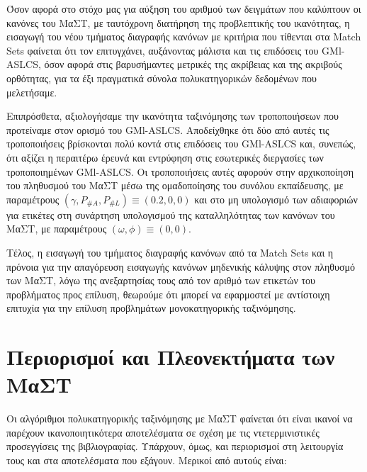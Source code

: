 Όσον αφορά στο στόχο μας για αύξηση του αριθμού των δειγμάτων που καλύπτουν οι κανόνες του ΜαΣΤ, με ταυτόχρονη διατήρηση της προβλεπτικής του ικανότητας, η εισαγωγή του νέου τμήματος διαγραφής κανόνων με κριτήρια που τίθενται στα Match Sets φαίνεται ότι τον επιτυγχάνει, αυξάνοντας μάλιστα και τις επιδόσεις του GMl-ASLCS, όσον αφορά στις βαρυσήμαντες μετρικές της ακρίβειας και της ακριβούς ορθότητας, για τα έξι πραγματικά σύνολα πολυκατηγορικών δεδομένων που μελετήσαμε.

Επιπρόσθετα, αξιολογήσαμε την ικανότητα ταξινόμησης των τροποποιήσεων που προτείναμε στον ορισμό του GMl-ASLCS. Αποδείχθηκε ότι δύο από αυτές τις τροποποιήσεις βρίσκονται πολύ κοντά στις επιδόσεις του GMl-ASLCS και, συνεπώς, ότι αξίζει η περαιτέρω έρευνά και εντρύφηση στις εσωτερικές διεργασίες των τροποποιημένων GMl-ASLCS. Οι τροποποιήσεις αυτές αφορούν στην αρχικοποίηση του πληθυσμού του ΜαΣΤ μέσω της ομαδοποίησης του συνόλου εκπαίδευσης, με παραμέτρους $(\gamma, P_{\#A}, P_{\#L}) \equiv (0.2, 0, 0)$ και στο μη υπολογισμό των αδιαφοριών για ετικέτες στη συνάρτηση υπολογισμού της καταλληλότητας των κανόνων του ΜαΣΤ, με παραμέτρους $(\omega, \phi) \equiv (0,0)$. 

Τέλος, η εισαγωγή του τμήματος διαγραφής κανόνων από τα Match Sets και η πρόνοια για την απαγόρευση εισαγωγής κανόνων μηδενικής κάλυψης στον πληθυσμό των ΜαΣΤ, λόγω της ανεξαρτησίας τους από τον αριθμό των ετικετών του προβλήματος προς επίλυση, θεωρούμε ότι μπορεί να εφαρμοστεί με αντίστοιχη επιτυχία για την επίλυση προβλημάτων μονοκατηγορικής ταξινόμησης.



\section{Περιορισμοί και Πλεονεκτήματα των ΜαΣΤ}
Οι αλγόριθμοι πολυκατηγορικής ταξινόμησης με ΜαΣΤ φαίνεται ότι είναι ικανοί να παρέχουν ικανοποιητικότερα αποτελέσματα σε σχέση με τις ντετερμινιστικές προσεγγίσεις της βιβλιογραφίας. Υπάρχουν, όμως, και περιορισμοί στη λειτουργία τους και στα αποτελέσματα που εξάγουν. Μερικοί από αυτούς είναι:

